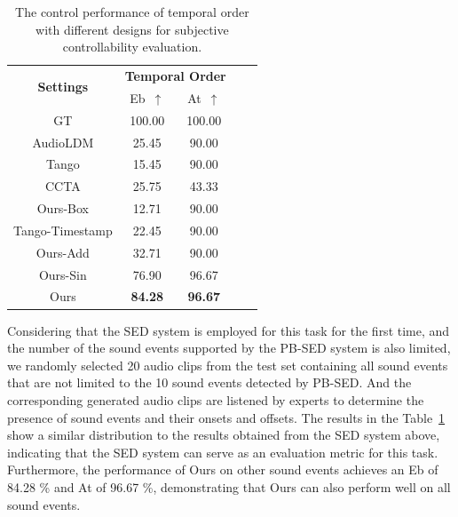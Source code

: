 \documentclass[letterpaper]{article} %
\begin{document}
 
\begin{table}[!h]\footnotesize
    \centering
    \caption{The control performance of temporal order with different designs for subjective controllability evaluation.}
    \label{tab:subjective controllability evaluation}
        \begin{tabular}{c|cccc}
        \toprule
        \multirow{2}{*}{\textbf{Settings}} & \multicolumn{2}{c}{\textbf{Temporal Order}} \\
         & Eb~$\uparrow$ & At~$\uparrow$  \\
        \midrule
        \midrule
         GT & 100.00 & 100.00\\
         \midrule
         AudioLDM & 25.45 & 90.00 \\
         Tango & 15.45 & 90.00 \\
         CCTA & 25.75 & 43.33 \\
         Ours-Box & 12.71 & 90.00 \\
         Tango-Timestamp & 22.45 & 90.00 \\
         Ours-Add & 32.71 & 90.00 \\
         Ours-Sin & 76.90 & 96.67 \\
         Ours & \textbf{84.28} & \textbf{96.67} \\
        \bottomrule
        \end{tabular}
\end{table}
 
 Considering that the SED system is employed for this task for the first time, and the number of the sound events supported by the PB-SED system is also limited, we randomly selected 20 audio clips from the test set containing all sound events that are not limited to the 10 sound events detected by PB-SED. And the corresponding generated audio clips are listened by experts to determine the presence of sound events and their onsets and offsets. The results in the Table~\ref{tab:subjective controllability evaluation} show a similar distribution to the results obtained from the SED system above, indicating that the SED system can serve as an evaluation metric for this task. Furthermore, the performance of Ours on other sound events achieves an Eb of 84.28 \% and At of 96.67 \%, demonstrating that Ours can also perform well on all sound events.

\end{document}
